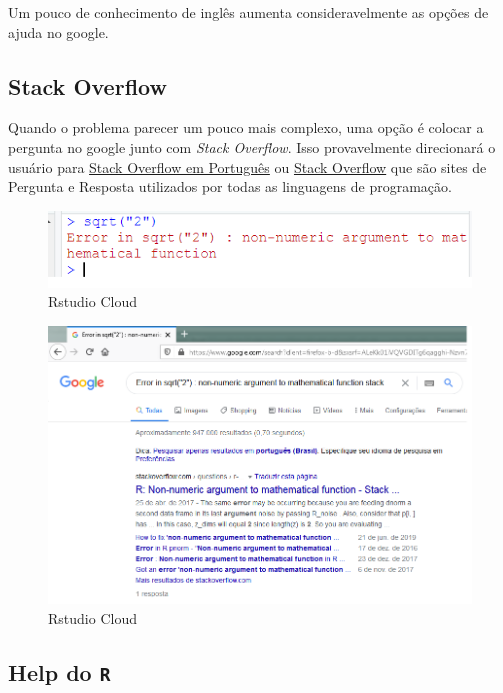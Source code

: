 \documentclass[
]{book}
\theoremstyle{definition}
\theoremstyle{definition}
\theoremstyle{definition}
\theoremstyle{remark}
\begin{document}
Um pouco de conhecimento de inglês aumenta consideravelmente as opções de ajuda no google.

\hypertarget{stack-overflow}{%
\subsection{Stack Overflow}\label{stack-overflow}}

Quando o problema parecer um pouco mais complexo, uma opção é colocar a pergunta no google junto com \emph{Stack Overflow}. Isso provavelmente direcionará o usuário para \href{https://pt.stackoverflow.com/}{Stack Overflow em Português} ou \href{https://stackoverflow.com/}{Stack Overflow} que são sites de Pergunta e Resposta utilizados por todas as linguagens de programação.

\begin{figure}
\includegraphics[width=0.9\linewidth]{Figuras/sqrt3} \caption{Rstudio Cloud}\label{fig:sq3}
\end{figure}

\begin{figure}
\includegraphics[width=0.9\linewidth]{Figuras/sqrt2} \caption{Rstudio Cloud}\label{fig:sq2}
\end{figure}

\hypertarget{help-do-r}{%
\subsection{\texorpdfstring{Help do \texttt{R}}{Help do R}}\label{help-do-r}}
\end{document}
